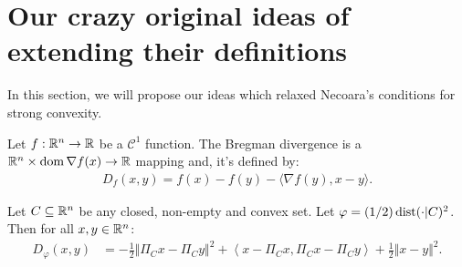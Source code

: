 \documentclass[12pt]{article}
\begin{document}
\section{Our crazy original ideas of extending their definitions}
    In this section, we will propose our ideas which relaxed Necoara's conditions for strong convexity.
    \begin{definition}\label{def:bd}
        Let $f: \mathbb R^n \rightarrow \mathbb R$ be a $\mathcal C^1$ function. 
        The Bregman divergence is a $\mathbb R^n \times \operatorname{dom} \nabla f(x)\rightarrow \mathbb R$ mapping and, it's defined by:  
        \begin{align*}
            D_f(x, y) = f(x) - f(y) - \langle \nabla f(y), x - y\rangle. 
        \end{align*}
    \end{definition}
    \begin{theorem}\label{thm:bd-dist-sq}
        Let $C \subseteq \mathbb R^n$ be any closed, non-empty and convex set. 
        Let $\varphi = (1/2)\operatorname{dist}(\cdot | C)^2$.
        Then for all $x, y \in \mathbb R^n$: 
        \begin{align*}
            D_{\varphi}(x, y) 
            &= 
            - \frac{1}{2}\Vert \Pi_C x - \Pi_C y\Vert^2
            + \left\langle x - \Pi_C x, \Pi_C x - \Pi_C y\right\rangle
            + \frac{1}{2} \Vert x - y\Vert^2. 
        \end{align*}
    \end{theorem}
\end{document}
